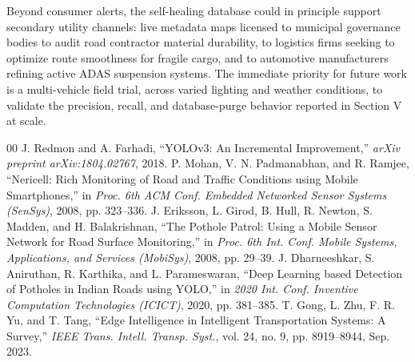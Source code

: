 \documentclass[conference]{IEEEtran}
\begin{document}
Beyond consumer alerts, the self-healing database could in principle support secondary utility channels: live metadata maps licensed to municipal governance bodies to audit road contractor material durability, to logistics firms seeking to optimize route smoothness for fragile cargo, and to automotive manufacturers refining active ADAS suspension systems. The immediate priority for future work is a multi-vehicle field trial, across varied lighting and weather conditions, to validate the precision, recall, and database-purge behavior reported in Section V at scale.

\begin{thebibliography}{00}
 J. Redmon and A. Farhadi, ``YOLOv3: An Incremental Improvement,'' \textit{arXiv preprint arXiv:1804.02767}, 2018.
 P. Mohan, V. N. Padmanabhan, and R. Ramjee, ``Nericell: Rich Monitoring of Road and Traffic Conditions using Mobile Smartphones,'' in \textit{Proc. 6th ACM Conf. Embedded Networked Sensor Systems (SenSys)}, 2008, pp. 323--336.
 J. Eriksson, L. Girod, B. Hull, R. Newton, S. Madden, and H. Balakrishnan, ``The Pothole Patrol: Using a Mobile Sensor Network for Road Surface Monitoring,'' in \textit{Proc. 6th Int. Conf. Mobile Systems, Applications, and Services (MobiSys)}, 2008, pp. 29--39.
 J. Dharneeshkar, S. Aniruthan, R. Karthika, and L. Parameswaran, ``Deep Learning based Detection of Potholes in Indian Roads using YOLO,'' in \textit{2020 Int. Conf. Inventive Computation Technologies (ICICT)}, 2020, pp. 381--385.
 T. Gong, L. Zhu, F. R. Yu, and T. Tang, ``Edge Intelligence in Intelligent Transportation Systems: A Survey,'' \textit{IEEE Trans. Intell. Transp. Syst.}, vol. 24, no. 9, pp. 8919--8944, Sep. 2023.
\end{thebibliography}
\end{document}
